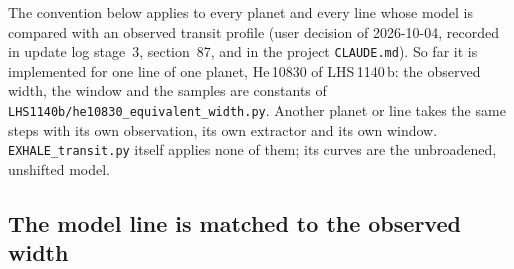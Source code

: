 \documentclass[english,a4paper]{my_memo}
\begin{document}
The convention below applies to every planet and every line whose model is
compared with an observed transit profile (user decision of 2026-10-04,
recorded in update log stage~3, section~87, and in the project
\texttt{CLAUDE.md}). So far it is implemented for one line of one planet,
He\,10830 of LHS\,1140\,b: the observed width, the window and the samples are
constants of \texttt{LHS1140b/he10830\_equivalent\_width.py}. Another planet
or line takes the same steps with its own observation, its own extractor and
its own window. \texttt{EXHALE\_transit.py} itself applies none of them; its
curves are the unbroadened, unshifted model.

\subsection{The model line is matched to the observed width}
\label{sec:widthmatch}
\end{document}
